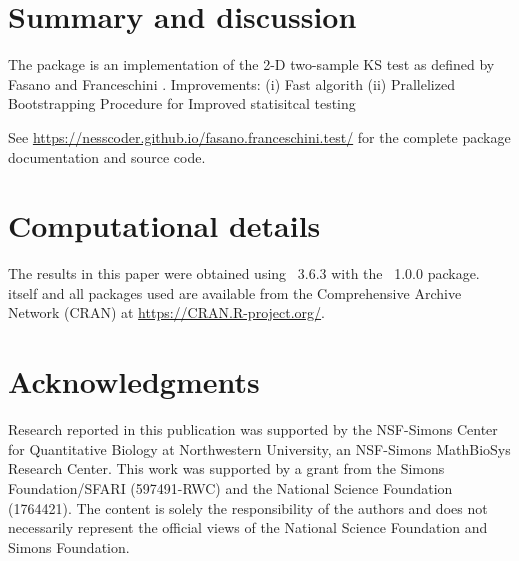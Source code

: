 \documentclass[codesnippet]{jss}
\begin{document}

\section{Summary and discussion} \label{sec:summary}

The  package is an  implementation of the 2-D two-sample KS test as defined by Fasano and Franceschini \citep{Fasano1987}.
Improvements:
  (i) Fast algorith
  (ii) Prallelized Bootstrapping Procedure for Improved statisitcal testing

  See \url{https://nesscoder.github.io/fasano.franceschini.test/} for the complete package documentation and source code.



\section*{Computational details}


The results in this paper were obtained using
~3.6.3 with the
~1.0.0 package.  itself
and all packages used are available from the Comprehensive
 Archive Network (CRAN) at
\url{https://CRAN.R-project.org/}.


\section*{Acknowledgments}

Research reported in this publication was supported by the NSF-Simons Center for Quantitative Biology at Northwestern University, an NSF-Simons MathBioSys Research Center. This work was supported by a grant from the Simons Foundation/SFARI (597491-RWC) and the National Science Foundation (1764421). The content is solely the responsibility of the authors and does not necessarily represent the official views of the National Science Foundation and Simons Foundation.
\end{document}
